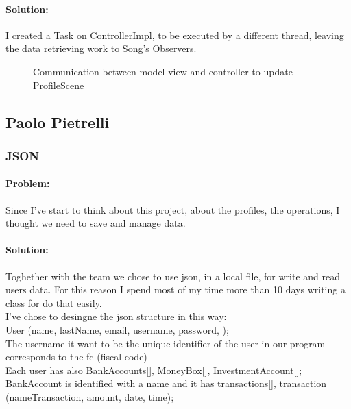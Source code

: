 \documentclass[a4paper,12pt]{report}
\begin{document}
        \paragraph{Solution:}I created a Task on ControllerImpl, to be executed by a different thread, leaving the data retrieving work to Song's Observers.
            \begin{figure}[H]
                \caption{Communication between model view and controller to update ProfileScene}
                \label{fig:my_label}
            \end{figure}

\subsection{Paolo Pietrelli}

	\subsubsection{JSON}
		\paragraph{Problem:}Since I've start to think about this project,  about the profiles, the operations, I thought we need to save and manage data. 
		\paragraph{Solution:}Toghether with the team we chose to use json, in a local file, for write and read users data. For this reason I spend most of my time more than 10 days writing a class for do that easily.
		\\
		I've chose to desingne the json structure in this way:
		\\
		User (name, lastName,  email, username, password, );
		\\
		The username it want to be the unique identifier of the user in our program corresponds to the fc (fiscal code)
        \\
		Each user has also BankAccounts[], MoneyBox[], InvestmentAccount[];
		\\
		BankAccount is identified with a name and it has transactions[], transaction (nameTransaction, amount, date, time);
		
\end{document}
